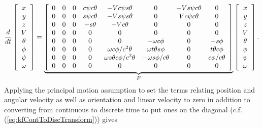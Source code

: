 {\footnotesize
\begin{align}
\label{eq:kfjacobianresult}
\frac{d}{dt}\left[\begin{array}{c}
x \\ y \\ z \\ V \\ \theta \\ \phi \\ \psi \\ \omega
\end{array}\right] =
\underbrace{\left[\begin{array}{c c c c c c c c}
0 & 0 & 0 & c\psi c\theta & -V c\psi s\theta               & 0                     & -V s\psi c\theta & 0 \\
0 & 0 & 0 & s\psi c\theta & -V s\psi s\theta               & 0                     & V c\psi c\theta  & 0 \\
0 & 0 & 0 & -s\theta      & -V c\theta                     & 0                     & 0                & 0 \\
0 & 0 & 0 & 0             & 0                              & 0                     & 0                & 0 \\
0 & 0 & 0 & 0             & 0                              & -\omega c\phi         & 0                & -s\phi \\
0 & 0 & 0 & 0             & \omega c\phi/c^2\theta         & \omega t\theta s\phi  & 0                & t\theta c\phi \\
0 & 0 & 0 & 0             & \omega s\theta c\phi/c^2\theta & -\omega s\phi/c\theta & 0                & c\phi/c\theta \\
0 & 0 & 0 & 0             & 0                              & 0                     & 0                & 0
\end{array}\right]}_{F}
\left[\begin{array}{c}
x \\ y \\ z \\ V \\ \theta \\ \phi \\ \psi \\ \omega
\end{array}\right].
\end{align}
}
Applying the principal motion assumption to set the terms relating position and angular velocity as well as orientation and linear velocity to zero in addition to converting from continuous to discrete time to put ones on the diagonal (c.f. (\ref{eq:kfContToDiscTransform})) gives
